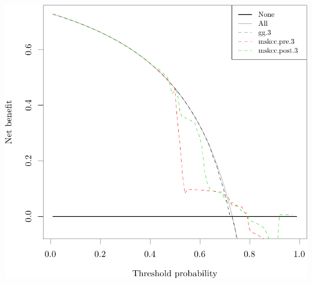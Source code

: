 \documentclass{article}\usepackage[]{graphicx}\usepackage[]{color}
\makeatletter
\def\maxwidth{ %
  \ifdim\Gin@nat@width>\linewidth
    \linewidth
  \else
    \Gin@nat@width
  \fi
}
\newenvironment{knitrout}{}{} %
\makeatother
\begin{document}
\begin{knitrout}
{\centering \includegraphics[width=\maxwidth]{figure/07-model-selection-dca-9} 

}



\end{knitrout}
\end{document}
